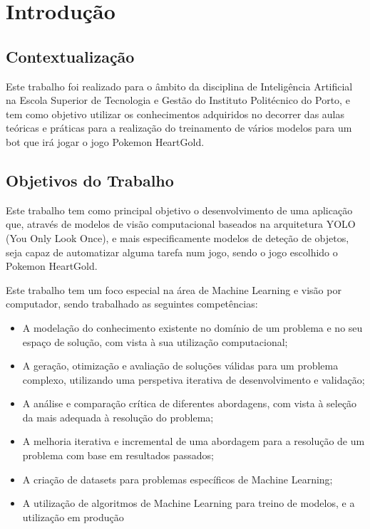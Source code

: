 \section{Introdução}
\subsection{Contextualização}
Este trabalho foi realizado para o âmbito da disciplina de Inteligência Artificial na Escola Superior de Tecnologia e Gestão do Instituto Politécnico do Porto, e tem como objetivo utilizar os conhecimentos adquiridos no decorrer das aulas teóricas e práticas para a realização do treinamento de vários modelos para um bot que irá jogar o jogo Pokemon HeartGold.

\subsection{Objetivos do Trabalho}
Este trabalho tem como principal objetivo o desenvolvimento de uma aplicação que, através de modelos de visão computacional baseados na arquitetura YOLO (You Only Look Once), e mais especificamente modelos de deteção de objetos, seja capaz de automatizar alguma tarefa num jogo, sendo o jogo escolhido o Pokemon HeartGold.

Este trabalho tem um foco especial na área de Machine Learning e visão por computador, sendo trabalhado as seguintes competências:

\begin{itemize}
    \item A modelação do conhecimento existente no domínio de um problema e no seu espaço de solução, com vista à sua utilização computacional;
    \item A geração, otimização e avaliação de soluções válidas para um problema complexo, utilizando uma perspetiva iterativa de desenvolvimento e validação;
    \item A análise e comparação crítica de diferentes abordagens, com vista à seleção da mais adequada à resolução do problema;
    \item A melhoria iterativa e incremental de uma abordagem para a resolução de um problema com base em resultados passados;
    \item A criação de datasets para problemas específicos de Machine Learning;
    \item A utilização de algoritmos de Machine Learning para treino de modelos, e a utilização em produção
\end{itemize}

